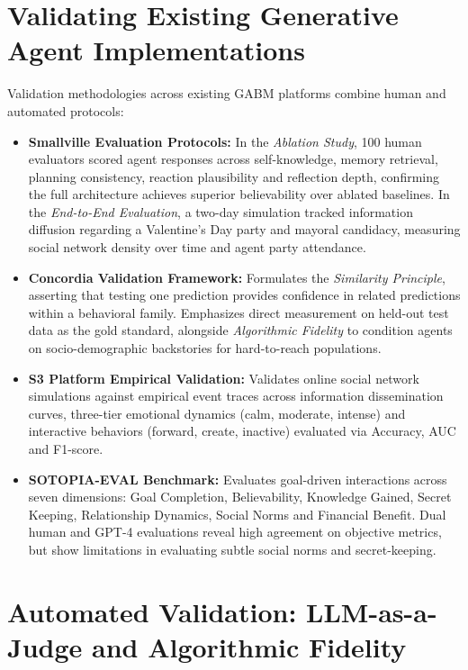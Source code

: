 \documentclass[12pt,a4paper]{report}
\begin{document}
\section{Validating Existing Generative Agent Implementations}
\label{sec:human_eval_studies}

Validation methodologies across existing GABM platforms combine human and automated protocols:
\begin{itemize}
    \item \textbf{Smallville Evaluation Protocols:} In the \textit{Ablation Study}, 100 human evaluators scored agent responses across self-knowledge, memory retrieval, planning consistency, reaction plausibility and reflection depth, confirming the full architecture achieves superior believability over ablated baselines. In the \textit{End-to-End Evaluation}, a two-day simulation tracked information diffusion regarding a Valentine's Day party and mayoral candidacy, measuring social network density over time and agent party attendance.
    \item \textbf{Concordia Validation Framework:} Formulates the \textit{Similarity Principle}, asserting that testing one prediction provides confidence in related predictions within a behavioral family. Emphasizes direct measurement on held-out test data as the gold standard, alongside \textit{Algorithmic Fidelity} to condition agents on socio-demographic backstories for hard-to-reach populations.
    \item \textbf{S3 Platform Empirical Validation:} Validates online social network simulations against empirical event traces across information dissemination curves, three-tier emotional dynamics (calm, moderate, intense) and interactive behaviors (forward, create, inactive) evaluated via Accuracy, AUC and F1-score.
    \item \textbf{SOTOPIA-EVAL Benchmark:} Evaluates goal-driven interactions across seven dimensions: Goal Completion, Believability, Knowledge Gained, Secret Keeping, Relationship Dynamics, Social Norms and Financial Benefit. Dual human and GPT-4 evaluations reveal high agreement on objective metrics, but show limitations in evaluating subtle social norms and secret-keeping.
\end{itemize}

\section{Automated Validation: LLM-as-a-Judge and Algorithmic Fidelity}
\label{sec:llm_as_judge}
\end{document}
